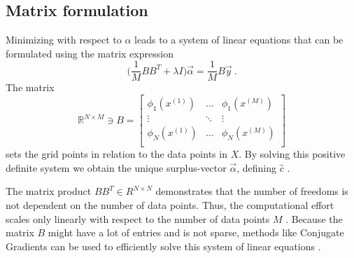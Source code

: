 \subsection{Matrix formulation}
Minimizing with respect to $\alpha$ leads to a system of linear equations that
can be formulated using the matrix expression
$$\Big(\frac{1}{M} BB^T + \lambda I \Big)\vec{\alpha} = \frac{1}{M}B\vec{y} \
.$$
The matrix
$$ \mathbb{R}^{N \times M} \ni B =
\begin{bmatrix}
  \phi_1(x^{(1)}) & \dots & \phi_1(x^{(M)}) \\
  \vdots & \ddots & \vdots \\
  \phi_N(x^{(1)}) & \dots  & \phi_N(x^{(M)}) \\
\end{bmatrix}
$$
sets the grid points in relation to the data points in $X$. By solving this
positive definite system we obtain the unique surplus-vector
$\vec{\alpha}$, defining $\hat{c}$ \cite{disshei}.
\par
The
matrix product $BB^T \in R^{N \times N}$ demonstrates that the number of freedoms
is not dependent on the number of data points. Thus, the computational effort
scales only linearly with respect to the number of data points $M$ \cite{disspfl}. Because
the matrix $B$ might have a lot of entries and is not sparse, methods like
Conjugate Gradients can be used to efficiently solve this system
of linear equations \cite{disshei}.

